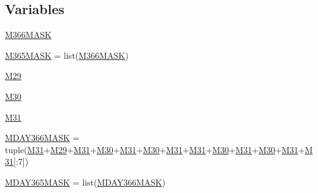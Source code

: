 \subsection*{Variables}
\begin{DoxyCompactItemize}
\item 
\hyperlink{namespacedateutil_1_1rrule_a8f1ab25274ea15275eb3a1bf6cf36e9e}{M366\+M\+A\+SK}
\item 
\hyperlink{namespacedateutil_1_1rrule_a80c91562f965077df5fd9f133aa706c2}{M365\+M\+A\+SK} = list(\hyperlink{namespacedateutil_1_1rrule_a8f1ab25274ea15275eb3a1bf6cf36e9e}{M366\+M\+A\+SK})
\item 
\hyperlink{namespacedateutil_1_1rrule_aa48d0a3018e00f60591bac3321202fc6}{M29}
\item 
\hyperlink{namespacedateutil_1_1rrule_a21e1626326f7f257e5d2e4a7195af9ba}{M30}
\item 
\hyperlink{namespacedateutil_1_1rrule_aff88a8ca05b8ccefded35b249ead0c6e}{M31}
\item 
\hyperlink{namespacedateutil_1_1rrule_adb3218fdcf9f08cba0a9945d7dc030ce}{M\+D\+A\+Y366\+M\+A\+SK} = tuple(\hyperlink{namespacedateutil_1_1rrule_aff88a8ca05b8ccefded35b249ead0c6e}{M31}+\hyperlink{namespacedateutil_1_1rrule_aa48d0a3018e00f60591bac3321202fc6}{M29}+\hyperlink{namespacedateutil_1_1rrule_aff88a8ca05b8ccefded35b249ead0c6e}{M31}+\hyperlink{namespacedateutil_1_1rrule_a21e1626326f7f257e5d2e4a7195af9ba}{M30}+\hyperlink{namespacedateutil_1_1rrule_aff88a8ca05b8ccefded35b249ead0c6e}{M31}+\hyperlink{namespacedateutil_1_1rrule_a21e1626326f7f257e5d2e4a7195af9ba}{M30}+\hyperlink{namespacedateutil_1_1rrule_aff88a8ca05b8ccefded35b249ead0c6e}{M31}+\hyperlink{namespacedateutil_1_1rrule_aff88a8ca05b8ccefded35b249ead0c6e}{M31}+\hyperlink{namespacedateutil_1_1rrule_a21e1626326f7f257e5d2e4a7195af9ba}{M30}+\hyperlink{namespacedateutil_1_1rrule_aff88a8ca05b8ccefded35b249ead0c6e}{M31}+\hyperlink{namespacedateutil_1_1rrule_a21e1626326f7f257e5d2e4a7195af9ba}{M30}+\hyperlink{namespacedateutil_1_1rrule_aff88a8ca05b8ccefded35b249ead0c6e}{M31}+\hyperlink{namespacedateutil_1_1rrule_aff88a8ca05b8ccefded35b249ead0c6e}{M31}\mbox{[}\+:7\mbox{]})
\item 
\hyperlink{namespacedateutil_1_1rrule_a07ab818db8e925a8e4be70ed387bbded}{M\+D\+A\+Y365\+M\+A\+SK} = list(\hyperlink{namespacedateutil_1_1rrule_adb3218fdcf9f08cba0a9945d7dc030ce}{M\+D\+A\+Y366\+M\+A\+SK})
\item 

\end{DoxyCompactItemize}
